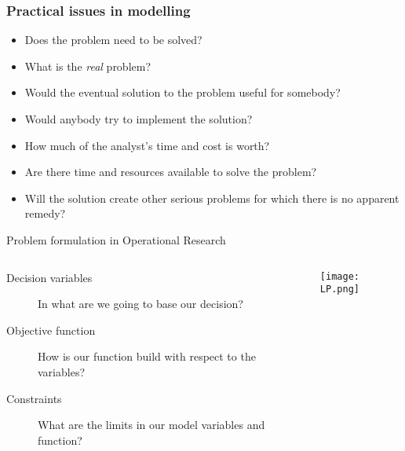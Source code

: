 \documentclass[c]{beamer}
\begin{document}
\begin{frame}
  \frametitle{Practical issues in modelling}
  \begin{itemize}
    \item Does the problem need to be solved?
    \item What is the {\it real} problem?
    \item Would the eventual solution to the problem useful for somebody?
    \item Would anybody try to implement the solution?
    \item How much of the analyst's time and cost is worth?
    \item Are there time and resources available to solve the problem?
    \item Will the solution create other serious problems for which there is no apparent remedy?
  \end{itemize}
\end{frame}

\begin{frame}{Problem formulation in Operational Research}
  \begin{columns}
    \begin{column}{0.5\textwidth}

      \begin{description}
        \item[Decision variables] In what are we going to base our decision?
        \item[Objective function] How is our function build with respect to the variables?
        \item[Constraints] What are the limits in our model variables and function?
      \end{description}
    \end{column}
    \begin{column}{0.5\textwidth}
      \begin{center}
        \texttt{[image: LP.png]}
      \end{center}
    \end{column}
  \end{columns}
\end{frame}
\end{document}
